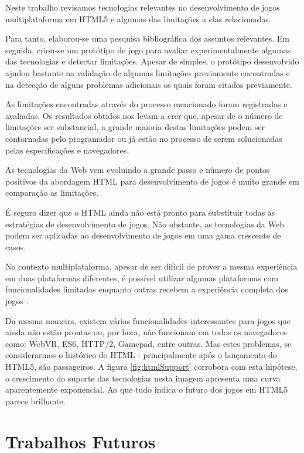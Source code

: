 
Neste trabalho revisamos tecnologias relevantes no desenvolvimento
de jogos multiplataforma em HTML5 e algumas das limitações a elas
relacionadas.

Para tanto, elaborou-se uma pesquisa bibliográfica
dos assuntos relevantes. Em seguida, criou-se um protótipo de jogo
para avaliar experimentalmente algumas das tecnologias e detectar
limitações. Apesar de simples, o protótipo desenvolvido ajudou
bastante na validação de algumas limitações previamente encontradas
e na detecção de alguns problemas adicionais os quais foram citados
previamente.

As limitações encontradas através do processo mencionado foram
registradas e avaliadas. Os resultados obtidos nos levam a crer que,
apesar de o número de limitações ser substancial, a grande maioria
destas limitações podem ser contornadas pelo programador ou já estão
no processo de serem solucionadas pelas especificações e navegadores.

As tecnologias da Web vem evoluindo a grande passo e número de pontos
positivos da abordagem HTML para desenvolvimento de jogos é muito
grande em comparação as limitações.

É seguro dizer que o HTML ainda não está pronto para substituir todas
as estratégias de desenvolvimento de jogos. Não obstante, as tecnologias
da Web podem ser aplicadas ao desenvolvimento de jogos em uma gama
crescente de casos.

No contexto multiplataforma, apesar de ser difícil de prover a
mesma experiência em duas plataformas diferentes, é possível
utilizar algumas plataformas com funcionalidades limitadas enquanto
outras recebem a experiência completa dos jogos \autocite[p.
1]{currentStateCrossPlatform}.


Da mesma maneira, existem várias funcionalidades interessantes para
jogos que ainda não estão prontas ou, por hora, não funcionam
em todos os navegadores como: WebVR, ES6, HTTP/2, Gamepad, entre
outras. Mas estes problemas, se considerarmos o histórico do HTML -
principalmente após o lançamento do HTML5, são passageiros. A figura
\ref{fig:htmlSupport} corrobora com esta hipótese, o crescimento do
suporte das tecnologias nesta imagem apresenta uma curva aparentemente
exponencial. Ao que tudo indica o futuro dos jogos em HTML5 parece
brilhante.

\section{Trabalhos Futuros}

